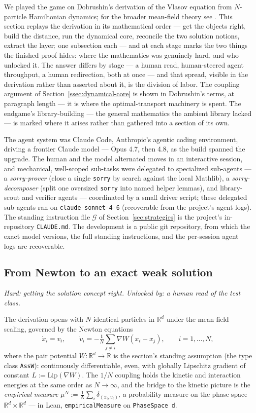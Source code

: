 \documentclass[11pt]{article}
\theoremstyle{plain}
\theoremstyle{definition}
\theoremstyle{remark}
\newcommand{\R}{\mathbb{R}}
\newcommand{\lean}[1]{\texttt{#1}}
\begin{document}
We played the game on Dobrushin's derivation \cite{Dobrushin} of the Vlasov
equation from $N$-particle Hamiltonian dynamics; for the broader mean-field theory
see \cite{Spohn,Golse,Neunzert}. This section replays the derivation in its
mathematical order --- get the objects right, build the distance, run the dynamical
core, reconcile the two solution notions, extract the layer; one subsection each ---
and at each stage marks the two things the finished proof hides: where the
mathematics was genuinely hard, and who unlocked it. The answer differs by stage ---
a human read, human-steered agent throughput, a human redirection, both at once --- and that
spread, visible in the derivation rather than asserted about it, is the division of
labor. The coupling argument of Section~\ref{ssec:dynamical-core} is shown in
Dobrushin's terms, at paragraph length --- it is where the optimal-transport
machinery is spent.
The endgame's library-building --- the general mathematics the ambient library
lacked --- is marked where it arises rather than gathered into a section of its own.

The agent system was Claude Code, Anthropic's agentic coding environment, driving a
frontier Claude model --- Opus 4.7, then 4.8, as the build spanned the upgrade. The
human and the model alternated moves in
an interactive session, and mechanical, well-scoped sub-tasks were delegated to
specialized sub-agents --- a \emph{sorry-prover} (close a single \lean{sorry} by
search against the local Mathlib), a \emph{sorry-decomposer} (split one oversized
\lean{sorry} into named helper lemmas), and library-scout and verifier agents ---
coordinated by a small driver script; these delegated sub-agents ran on
\lean{claude-sonnet-4-6} (recoverable from the project's agent logs). The standing
instruction file $\mathcal{G}$
of Section~\ref{sec:strategies} is the project's in-repository \lean{CLAUDE.md}. The
development is a public git repository, from which the exact model versions, the
full standing instructions, and the per-session agent logs are recoverable.

\subsection{From Newton to an exact weak solution}\label{ssec:newton-to-weak}

\noindent\emph{Hard: getting the solution concept right. Unlocked by: a human read of the test class.}

The derivation opens with $N$ identical particles in $\R^d$ under the mean-field
scaling, governed by the Newton equations
\[
  \dot{x}_i = v_i, \qquad
  \dot{v}_i = -\tfrac1N\textstyle\sum_{j\neq i}\nabla W(x_i-x_j),
  \qquad i=1,\dots,N,
\]
where the pair potential $W:\R^d\to\R$ is the section's standing assumption (the
type class \lean{AssW}): continuously differentiable, even, with globally Lipschitz
gradient of constant $L:=\mathrm{Lip}(\nabla W)$. The $1/N$ coupling holds the
kinetic and interaction energies at the same order as $N\to\infty$, and the bridge
to the kinetic picture is the \emph{empirical measure}
$\mu^N := \tfrac1N\sum_i\delta_{(x_i,v_i)}$, a probability measure on the phase space
$\R^d\times\R^d$ --- in Lean, \lean{empiricalMeasure} on \lean{PhaseSpace d}.
\end{document}
